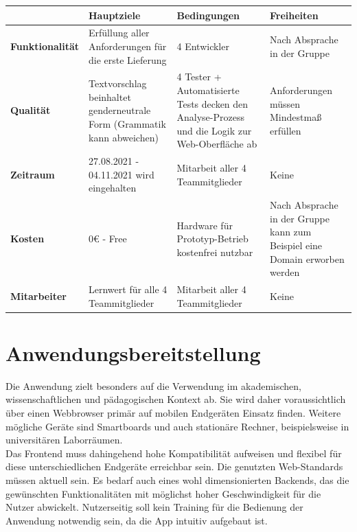\documentclass[paper=a4, parskip=half]{scrreprt}
\begin{document}
	\begin{tabular}
	{
		|p{}
		|p{}
		|p{}
		|p{}
		|}
	\hline
	\textbf{}
	&\textbf{Hauptziele}
	&\textbf{Bedingungen}
	&\textbf{Freiheiten}\\
	\hline
	\textbf{Funktionalität}
	&Erfüllung aller Anforderungen für die erste Lieferung
	&4 Entwickler
	&Nach Absprache in der Gruppe\\
	\hline
		\textbf{Qualität}
	&Textvorschlag beinhaltet genderneutrale Form (Grammatik kann abweichen)
	&4 Tester + Automatisierte Tests decken den Analyse-Prozess und die Logik zur Web-Oberfläche ab
	&Anforderungen müssen Mindestmaß erfüllen\\
	\hline
		\textbf{Zeitraum}
	&27.08.2021 - 04.11.2021 wird eingehalten
	& Mitarbeit aller 4 Teammitglieder
	&Keine\\
	\hline
		\textbf{Kosten}
	&0€ - Free
	&Hardware für Prototyp-Betrieb kostenfrei nutzbar
	&Nach Absprache in der Gruppe kann zum Beispiel eine Domain erworben werden\\
	\hline
		\textbf{Mitarbeiter}
	&Lernwert für alle 4 Teammitglieder
	&Mitarbeit aller 4 Teammitglieder
	&Keine\\
	\hline


\end{tabular}


\section{Anwendungsbereitstellung}
Die Anwendung zielt besonders auf die Verwendung im akademischen, wissenschaftlichen und pädagogischen Kontext ab. Sie wird daher voraussichtlich über einen Webbrowser primär auf mobilen Endgeräten Einsatz finden. Weitere mögliche Geräte sind Smartboards und auch stationäre Rechner, beispielsweise in universitären Laborräumen.\\
Das Frontend muss dahingehend hohe Kompatibilität aufweisen und flexibel für diese unterschiedlichen Endgeräte erreichbar sein. Die genutzten Web-Standards müssen aktuell sein. Es bedarf auch eines wohl dimensionierten Backends, das die gewünschten Funktionalitäten mit möglichst hoher Geschwindigkeit für die Nutzer abwickelt. Nutzerseitig soll kein Training für die Bedienung der Anwendung notwendig sein, da die App intuitiv aufgebaut ist.

\printglossary
\pagebreak

\nocite{*}





\end{document}
